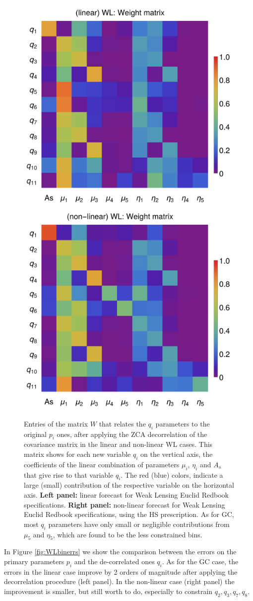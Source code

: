 \begin{figure}[htbp]
	\centering{}\includegraphics[width=0.4\linewidth]{Chapters/linear-nonlinear-MG-forecasts/figures/Decorrelations-WL/Weight_Matrix_ZCA_SquareNorm--_fiducialMGBin3_Euclid_WL_linearPK_}\includegraphics[width=0.4\linewidth]{Chapters/linear-nonlinear-MG-forecasts/figures/Decorrelations-WL/Weight_Matrix_ZCA_SquareNorm--_fiducialMGBin3_Euclid_WL_nonlinearPk__Zhao_}
	\caption[Weight matrix for ZCA decorrelation in a Euclid WL case.]{
Entries of the matrix $W$ that relates the $q_i$ parameters to the original $p_i$ ones, after applying the ZCA decorrelation of the covariance matrix in the linear and non-linear WL cases. This matrix shows for each new variable $q_i$ on the vertical axis, the coefficients of the linear combination of parameters $\mu_i$, $\eta_i$ and $A_s$ that give rise to that variable $q_i$. The red (blue) colors, indicate a large (small) contribution of the respective variable on the horizontal axis. \textbf{Left panel:} linear forecast for Weak Lensing Euclid Redbook specifications.
\textbf{Right panel:} non-linear forecast for Weak Lensing Euclid Redbook specifications, using the HS prescription.
As for GC, most $q_i$ parameters have only small or negligible contributions from $\mu_5$  and $\eta_5$, which are found to be the less constrained bins.
	\label{fig:Wmat-ZCA-WL}}
\end{figure}

In Figure \ref{fig:WLbinerrs} we show the comparison between the errors on the primary
parameters $p_i$ and the de-correlated ones $q_i$. As for the GC case, the errors in the linear case improve by 2 orders of magnitude after applying the decorrelation procedure (left panel). In the non-linear case (right panel) the improvement is smaller, but still worth to do, especially to constrain $q_2,q_3,q_7,q_8$.

